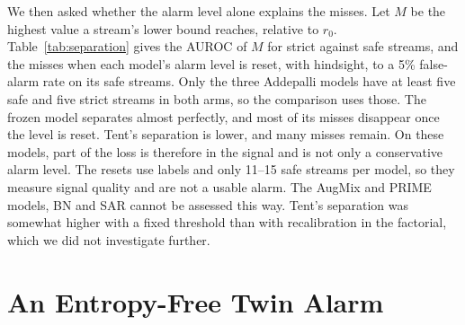 \documentclass[runningheads]{llncs}
\begin{document}
We then asked whether the alarm level alone explains the misses. Let $M$ be the highest value a stream's lower bound reaches, relative to $r_0$. Table~\ref{tab:separation} gives the AUROC of $M$ for strict against safe streams, and the misses when each model's alarm level is reset, with hindsight, to a 5\% false-alarm rate on its safe streams. Only the three Addepalli models have at least five safe and five strict streams in both arms, so the comparison uses those. The frozen model separates almost perfectly, and most of its misses disappear once the level is reset. Tent's separation is lower, and many misses remain. On these models, part of the loss is therefore in the signal and is not only a conservative alarm level. The resets use labels and only 11--15 safe streams per model, so they measure signal quality and are not a usable alarm. The AugMix and PRIME models, BN and SAR cannot be assessed this way. Tent's separation was somewhat higher with a fixed threshold than with recalibration in the factorial, which we did not investigate further.

\begin{table}[t]
\caption{Separation of strict and safe streams on the three Addepalli models, the only ones with enough streams in both arms. Exploratory; the 5\% level is set with hindsight.}
\label{tab:separation}
\centering\footnotesize\setlength{\tabcolsep}{5pt}
\end{table}

\section{An Entropy-Free Twin Alarm}
\label{sec:twin}
\end{document}

